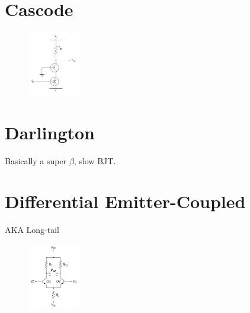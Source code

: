 \documentclass{report}
\newcommand{\imwidth}{0.2\textwidth}
\begin{document}
\section{Cascode}
\begin{figure}
\centering
\includegraphics[width = \imwidth]{CascodeWithNegative}
\caption{}
\end{figure}


\section{Darlington}
Basically a super $\beta$, slow BJT.

\section{Differential Emitter-Coupled}
AKA Long-tail
\begin{figure}
\centering
\includegraphics[width = \imwidth]{Differential_amplifier_long-tailed_pair}
\caption{}
\end{figure}
\end{document}
